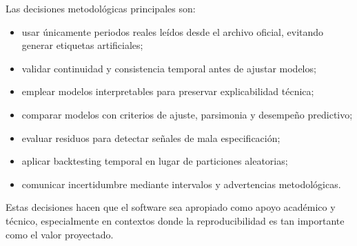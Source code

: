 Las decisiones metodológicas principales son:

\begin{itemize}
    \item usar únicamente periodos reales leídos desde el archivo oficial, evitando generar etiquetas artificiales;
    \item validar continuidad y consistencia temporal antes de ajustar modelos;
    \item emplear modelos interpretables para preservar explicabilidad técnica;
    \item comparar modelos con criterios de ajuste, parsimonia y desempeño predictivo;
    \item evaluar residuos para detectar señales de mala especificación;
    \item aplicar backtesting temporal en lugar de particiones aleatorias;
    \item comunicar incertidumbre mediante intervalos y advertencias metodológicas.
\end{itemize}

Estas decisiones hacen que el software sea apropiado como apoyo académico y técnico, especialmente en contextos donde la reproducibilidad es tan importante como el valor proyectado.
